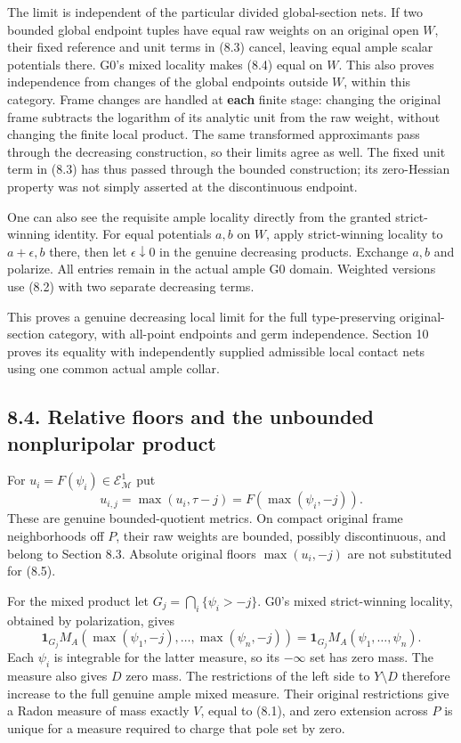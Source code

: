\documentclass[
  10pt,
]{article}
\begin{document}
The limit is independent of the particular divided global-section nets.
If two bounded global endpoint tuples have equal raw weights on an
original open \(W\), their fixed reference and unit terms in (8.3)
cancel, leaving equal ample scalar potentials there. G0's mixed locality
makes (8.4) equal on \(W\). This also proves independence from changes
of the global endpoints outside \(W\), within this category. Frame
changes are handled at \textbf{each} finite stage: changing the original
frame subtracts the logarithm of its analytic unit from the raw weight,
without changing the finite local product. The same transformed
approximants pass through the decreasing construction, so their limits
agree as well. The fixed unit term in (8.3) has thus passed through the
bounded construction; its zero-Hessian property was not simply asserted
at the discontinuous endpoint.

One can also see the requisite ample locality directly from the granted
strict-winning identity. For equal potentials \(a,b\) on \(W\), apply
strict-winning locality to \(a+\epsilon,b\) there, then let
\(\epsilon\downarrow0\) in the genuine decreasing products. Exchange
\(a,b\) and polarize. All entries remain in the actual ample G0 domain.
Weighted versions use (8.2) with two separate decreasing terms.

This proves a genuine decreasing local limit for the full
type-preserving original-section category, with all-point endpoints and
germ independence. Section 10 proves its equality with independently
supplied admissible local contact nets using one common actual ample
collar.

\subsection{8.4. Relative floors and the unbounded nonpluripolar
product}\label{relative-floors-and-the-unbounded-nonpluripolar-product}

For \(u_i=F(\psi_i)\in\mathcal E^1_{\mathcal M}\) put
\[u_{i,j}=\max(u_i,\tau-j)=F(\max(\psi_i,-j)).             \tag{8.5}\]
These are genuine bounded-quotient metrics. On compact original frame
neighborhoods off \(P\), their raw weights are bounded, possibly
discontinuous, and belong to Section 8.3. Absolute original floors
\(\max(u_i,-j)\) are not substituted for (8.5).

For the mixed product let \(G_j=\bigcap_i\{\psi_i>-j\}\). G0's mixed
strict-winning locality, obtained by polarization, gives
\[\mathbf1_{G_j}M_A(\max(\psi_1,-j),\ldots,\max(\psi_n,-j))
=\mathbf1_{G_j}M_A(\psi_1,\ldots,\psi_n).                \tag{8.6}\]
Each \(\psi_i\) is integrable for the latter measure, so its \(-\infty\)
set has zero mass. The measure also gives \(D\) zero mass. The
restrictions of the left side to \(Y\setminus D\) therefore increase to
the full genuine ample mixed measure. Their original restrictions give a
Radon measure of mass exactly \(V\), equal to (8.1), and zero extension
across \(P\) is unique for a measure required to charge that pole set by
zero.
\end{document}
